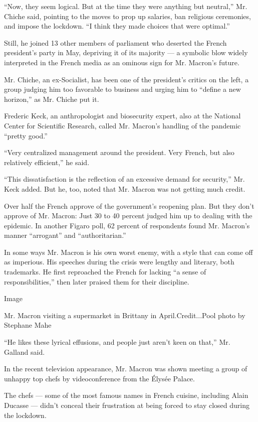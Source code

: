 ``Now, they seem logical. But at the time they were anything but
neutral,'' Mr. Chiche said, pointing to the moves to prop up salaries,
ban religious ceremonies, and impose the lockdown. ``I think they made
choices that were optimal.''

Still, he joined 13 other members of parliament who deserted the French
president's party in May, depriving it of its majority --- a symbolic
blow widely interpreted in the French media as an ominous sign for Mr.
Macron's future.

Mr. Chiche, an ex-Socialist, has been one of the president's critics on
the left, a group judging him too favorable to business and urging him
to ``define a new horizon,'' as Mr. Chiche put it.

Frederic Keck, an anthropologist and biosecurity expert, also at the
National Center for Scientific Research, called Mr. Macron's handling of
the pandemic ``pretty good.''

``Very centralized management around the president. Very French, but
also relatively efficient,'' he said.

``This dissatisfaction is the reflection of an excessive demand for
security,'' Mr. Keck added. But he, too, noted that Mr. Macron was not
getting much credit.

Over half the French approve of the government's reopening plan. But
they don't approve of Mr. Macron: Just 30 to 40 percent judged him up to
dealing with the epidemic. In another Figaro poll, 62 percent of
respondents found Mr. Macron's manner ``arrogant'' and
``authoritarian.''

In some ways Mr. Macron is his own worst enemy, with a style that can
come off as imperious. His speeches during the crisis were lengthy and
literary, both trademarks. He first reproached the French for lacking
``a sense of responsibilities,'' then later praised them for their
discipline.

Image

Mr. Macron visiting a supermarket in Brittany in April.Credit...Pool
photo by Stephane Mahe

``He likes these lyrical effusions, and people just aren't keen on
that,'' Mr. Galland said.

In the recent television appearance, Mr. Macron was shown meeting a
group of unhappy top chefs by videoconference from the Élysée Palace.

The chefs --- some of the most famous names in French cuisine, including
Alain Ducasse --- didn't conceal their frustration at being forced to
stay closed during the lockdown.

